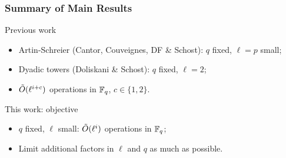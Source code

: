 \documentclass[12pt]{beamer}
\begin{document}
\begin{frame}
  \frametitle{Summary of Main Results}
  \footnotesize

  \vspace{-2mm}

  \begin{block}{Previous work}
    \begin{itemize}
    \item Artin-Schreier (Cantor, Couveignes, DF \& Schost): $q$ fixed, \alert{$\ell=p$} small;
    \item Dyadic towers (Doliskani \& Schost): $q$ fixed, \alert{$\ell=2$};
    \item \alert{$\tilde{O}(\ell^{i+c})$} operations in $\mathbb{F}_q$, $c\in\{1,2\}$.
    \end{itemize}
  \end{block}  

  \vspace{-2mm}

  \begin{block}{This work: objective}
    \begin{itemize}
    \item $q$ fixed, $\ell$ small: \alert{$\tilde{O}(\ell^i)$} operations in $\mathbb{F}_q$;
    \item Limit additional factors in $\ell$ and $q$ as much as possible.
    \end{itemize}
  \end{block}
  
  \vspace{-2mm}

  \resizebox{0.93\textwidth}{!}{
    \begin{minipage}{\textwidth}
      \[
      \begin{array}{c|cccc}
        \text{Condition} & \text{\bf Initialization} & \mathbf{Q_i, T_i} & \text{\bf Embedding eval.}\\
        \hline \hline
        q = 1 \bmod \ell & O(1)  & O(\ell^i) & O(\ell^i) \\
        q = -1 \bmod \ell & O(1) & O(\ell^i) & O(\Mult(\ell^i) \log(\ell^i)) \\
        - & O (\ell^2) & O(\Mult(\ell^{i+1})\Mult(\ell)\log(\ell^i)^2) & O( \Mult(\ell^{i+1})\Mult(\ell)\log(\ell^i))\\
        4\ell \le q^{1 / 4} & \tildO(\ell^3) \text{~(bit)}  & O(\Mult(\ell^i)\log(\ell^i)) & O(\Mult(\ell^i) \log(\ell^i)) \\
        4\ell \le q^{1 / 4} & \tildO(\Mult(\ell)) & O(\Mult(\ell^i) \log(\ell^i)) & O(\Mult(\ell^i) \log(\ell^i)) \vspace{-0.5cm}
      \end{array}
      \]
    \end{minipage}
  }
\end{frame}
\end{document}
